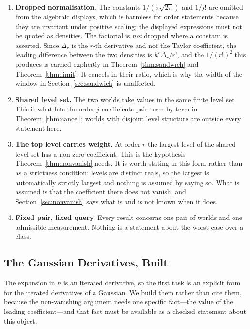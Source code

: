\documentclass[conference]{IEEEtran}
\theoremstyle{definition}
\begin{document}
\begin{enumerate}
\item[1)] \textbf{Dropped normalisation.} The constants $1/(\sigma\sqrt{2\pi})$ and $1/j!$ are
omitted from the algebraic displays, which is harmless for order statements because they are
invariant under positive scaling; the displayed expressions must not be quoted as densities.
The factorial is \emph{not} dropped where a constant is asserted. Since $\Delta_{r}$ is the
$r$-th derivative and not the Taylor coefficient, the leading difference between the two
densities is $h^{r}\Delta_{r}/r!$, and the $1/(r!)^{2}$ this produces is carried explicitly in
Theorem~\ref{thm:sandwich} and Theorem~\ref{thm:limit}. It cancels in their ratio, which is
why the width of the window in Section~\ref{sec:sandwich} is unaffected.

\item[2)] \textbf{Shared level set.} The two worlds take values in the same finite level
set. This is what lets the order-$j$ coefficients pair term by term in
Theorem~\ref{thm:cancel}; worlds with disjoint level structure are outside every statement
here.

\item[3)] \textbf{The top level carries weight.} At order $r$ the largest level of the shared
level set has a non-zero coefficient. This is the hypothesis
Theorem~\ref{thm:nonvanish} needs. It is worth stating in this form rather than as a
strictness condition: levels are distinct reals, so the largest is automatically strictly
largest and nothing is assumed by saying so. What is assumed is that the coefficient there
does not vanish, and Section~\ref{sec:nonvanish} says what is and is not known when it does.

\item[4)] \textbf{Fixed pair, fixed query.} Every result concerns one pair of worlds and one
admissible measurement. Nothing is a statement about the worst case over a class.
\end{enumerate}

\subsection{The Gaussian Derivatives, Built}
\label{sec:hermite}

The expansion in $h$ is an iterated derivative, so the first task is an explicit form for the
iterated derivatives of a Gaussian. We build them rather than cite them, because the
non-vanishing argument needs one specific fact---the value of the leading coefficient---and
that fact must be available as a checked statement about this object.
\end{document}
